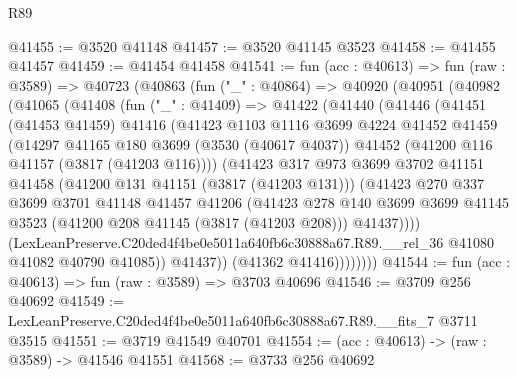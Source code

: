 \begin{lexlean}{R89}
\begin{coremodule}
@41455 := @3520 @41148
@41457 := @3520 @41145 @3523
@41458 := @41455 @41457
@41459 := @41454 @41458
@41541 := fun (acc : @40613) =>
  fun (raw : @3589) =>
  @40723
    (@40863
      (fun ("_" : @40864) =>
      @40920
        (@40951
          (@40982
            (@41065
              (@41408
                (fun ("_" : @41409) =>
                @41422
                  (@41440
                    (@41446
                      (@41451
                        (@41453 @41459)
                        @41416
                        (@41423
                          @1103
                          @1116
                          @3699
                          @4224
                          @41452
                          @41459
                          (@14297
                            @41165
                            @180
                            @3699
                            (@3530 (@40617 @4037))
                            @41452
                            (@41200 @116 @41157 (@3817 (@41203 @116))))
                          (@41423
                            @317
                            @973
                            @3699
                            @3702
                            @41151
                            @41458
                            (@41200 @131 @41151 (@3817 (@41203 @131)))
                            (@41423
                              @270
                              @337
                              @3699
                              @3701
                              @41148
                              @41457
                              @41206
                              (@41423
                                @278
                                @140
                                @3699
                                @3699
                                @41145
                                @3523
                                (@41200 @208 @41145 (@3817 (@41203 @208)))
                                @41437))))
                        (LexLeanPreserve.C20ded4f4be0e5011a640fb6c30888a67.R89.__rel_36
                          @41080
                          @41082
                          @40790
                          @41085))
                      @41437))
                  (@41362 @41416))))))))
@41544 := fun (acc : @40613) => fun (raw : @3589) => @3703 @40696
@41546 := @3709 @256 @40692
@41549 := LexLeanPreserve.C20ded4f4be0e5011a640fb6c30888a67.R89.__fits_7 @3711 @3515
@41551 := @3719 @41549 @40701
@41554 := (acc : @40613) -> (raw : @3589) -> @41546 @41551
@41568 := @3733
    @256
    @40692

\end{coremodule}
\end{lexlean}
